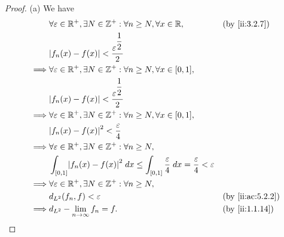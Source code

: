 \begin{proof}{(a)}
  We have
  \begin{align*}
             & \forall \varepsilon \in \R^+, \exists N \in \Z^+ : \forall n \geq N, \forall x \in \R,                                           &  & \by{ii:3.2.7}    \\
             & \abs{f_n(x) - f(x)} < \dfrac{\varepsilon^{\dfrac{1}{2}}}{2}                                                                                            \\
    \implies & \forall \varepsilon \in \R^+, \exists N \in \Z^+ : \forall n \geq N, \forall x \in [0, 1],                                                             \\
             & \abs{f_n(x) - f(x)} < \dfrac{\varepsilon^{\dfrac{1}{2}}}{2}                                                                                            \\
    \implies & \forall \varepsilon \in \R^+, \exists N \in \Z^+ : \forall n \geq N, \forall x \in [0, 1],                                                             \\
             & \abs{f_n(x) - f(x)}^2 < \dfrac{\varepsilon}{4}                                                                                                         \\
    \implies & \forall \varepsilon \in \R^+, \exists N \in \Z^+ : \forall n \geq N,                                                                                   \\
             & \int_{[0, 1]} \abs{f_n(x) - f(x)}^2 \; dx \leq \int_{[0, 1]} \dfrac{\varepsilon}{4} \; dx = \dfrac{\varepsilon}{4} < \varepsilon                       \\
    \implies & \forall \varepsilon \in \R^+, \exists N \in \Z^+ : \forall n \geq N,                                                                                   \\
             & d_{L^2}(f_n, f) < \varepsilon                                                                                                    &  & \by{ii:ac:5.2.2} \\
    \implies & d_{L^2} - \lim_{n \to \infty} f_n = f.                                                                                           &  & \by{ii:1.1.14}
  \end{align*}
\end{proof}

